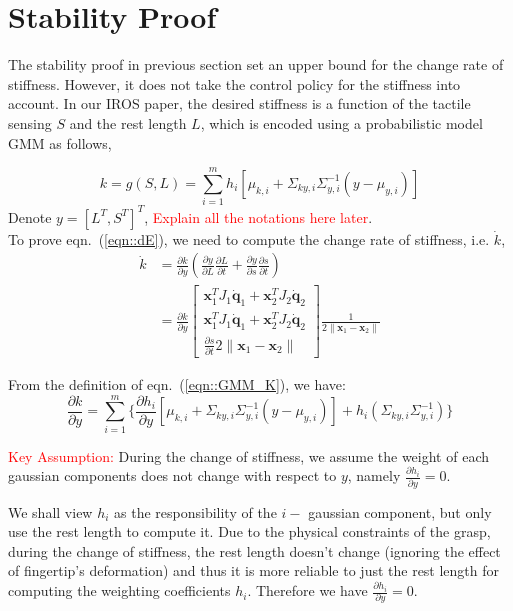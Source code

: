 \documentclass[]{article}
\begin{document}
\section{Stability Proof}
The stability proof in previous section set an upper bound for the change rate of stiffness. However, it does not take the control policy for the stiffness into account. In our IROS paper, the desired stiffness is a function of the tactile sensing $S$ and the rest length $L$, which is encoded using a probabilistic model GMM as follows,

\begin{equation}
k=g(S,L)=\sum_{i=1}^{m}h_i[\mu_{k,i}+\Sigma_{ky,i}\Sigma^{-1}_{y,i}(y-\mu_{y,i})]
\label{eqn::GMM_K}
\end{equation}    
Denote $y=[L^T,S^T]^T$, \textcolor{red}{Explain all the notations here later}. \\
To prove eqn.~(\ref{eqn::dE}), we need to compute the change rate of stiffness, i.e. $\dot k$,
\begin{align}
\dot k &= \frac{\partial k}{\partial y}(\frac{\partial y}{\partial L}\frac{\partial L}{\partial t}+\frac{\partial y}{\partial s}\frac{\partial s}{\partial t}) \\
&=\frac{\partial k}{\partial y}\begin{bmatrix}
\mathbf{x}_1^TJ_1\mathbf{\dot q}_1+\mathbf{x}_2^TJ_2\mathbf{\dot q}_2\\
\mathbf{x}_1^TJ_1\mathbf{\dot q}_1+\mathbf{x}_2^TJ_2\mathbf{\dot q}_2\\
\frac{\partial s}{\partial t}2\|\mathbf{x}_1-\mathbf{x}_2\|
\end{bmatrix}\frac{1}{2\|\mathbf{x}_1-\mathbf{x}_2\|}
\end{align}

From the definition of eqn.~(\ref{eqn::GMM_K}), we have:
\begin{equation}
\frac{\partial k}{\partial y} = \sum_{i=1}^{m}\{\frac{\partial h_i}{\partial y}[\mu_{k,i}+\Sigma_{ky,i}\Sigma^{-1}_{y,i}(y-\mu_{y,i})]+h_i(\Sigma_{ky,i}\Sigma^{-1}_{y,i})\}
\end{equation}

\textcolor{red}{Key Assumption:} During the change of stiffness, we assume the weight of each gaussian components does not change with respect to $y$, namely $\frac{\partial h_i}{\partial y}=0$.

We shall view $h_i$ as the responsibility of the $i-$ gaussian component, but only use the rest length to compute it. Due to the physical constraints of the grasp, during the change of stiffness, the rest length doesn't change (ignoring the effect of fingertip's deformation) and thus it is more reliable to just the rest length for computing the weighting coefficients $h_i$. Therefore we have $\frac{\partial h_i}{\partial y}=0$.
 
\end{document}
